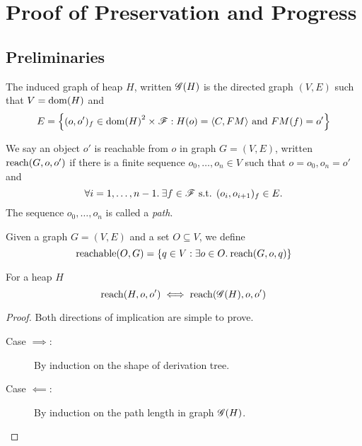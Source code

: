 \chapter{Proof of Preservation and Progress}
\label{cha:proof_of_pnp}

\section{Preliminaries}%
\label{sec:preliminaries}

\begin{definition}
  The induced graph of heap $H$, written $\mathscr{G}{(H)}$ is the directed graph
  $(V, E)$ such that $V = \mbox{$\mathrm{dom}$}{(H)}$ and 
  \begin{equation}
    E = \left\{ (o, o')_f \in \mbox{$\mathrm{dom}$}{(H)}^2 \times \mathscr{F}: 
      H(o) = \mbox{$\langle C, FM \rangle$} \text{ and } FM(f) = o' \right\}
  \end{equation}
\end{definition}

\begin{definition}
  We say an object $o'$ is reachable from $o$ in graph $G = (V,
  E)$, written $\mbox{$\mathrm{reach}$}{(G, o, o')}$ if there is a finite sequence $o_0, \dots,
  o_n \in V$ such that $o = o_0, o_n = o'$ and
  \begin{equation}
    \forall i = 1,\dots, n-1. \: \exists f \in \mathscr{F} \text{ s.t. } (o_i,
    o_{i+1})_f \in E.
  \end{equation}
  The sequence $o_0, \dots, o_n$ is called a \emph{path}.
\end{definition}

\begin{definition}
  Given a graph $G = (V, E)$ and a set $O \subseteq V$, we define
  \begin{equation}
    \mbox{$\mathrm{reachable}$}{(O, G)} = \left\{ q \in V: \exists o\in O.\: \mbox{$\mathrm{reach}$}{(G, o, q)}
    \right\} \notag
  \end{equation}
\end{definition}

\begin{proposition}
  \label{prop:reacheq}
  For a heap $H$ 
  \begin{equation}
    \mbox{$\mathrm{reach}$}{(H, o, o')} \iff \mbox{$\mathrm{reach}$}{(\ensuremath{\mathscr{G}}{(H)}, o, o')}
  \end{equation}
\end{proposition}

\begin{proof}
  Both directions of implication are simple to prove.
  \begin{description}
    \item[Case $\implies$:] By induction on the shape of derivation tree.
    \item[Case $\impliedby$:] By induction on the path length in graph
      $\mathscr{G}{(H)}$.
  \end{description}
\end{proof}

